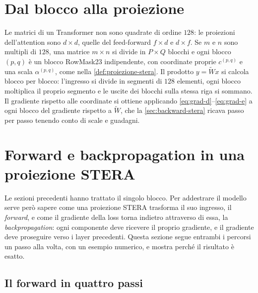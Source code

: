 \section{Dal blocco alla proiezione}
\label{sec:rettangolari}

Le matrici di un Transformer non sono quadrate di ordine $128$: le proiezioni dell'attention sono $d\times d$, quelle del feed-forward $f\times d$ e $d\times f$. Se $m$ e $n$ sono multipli di $128$, una matrice $m\times n$ si divide in $P\times Q$ blocchi e ogni blocco $(p,q)$ è un blocco RowMask23 indipendente, con coordinate proprie $c^{(p,q)}$ e una scala $\alpha^{(p,q)}$, come nella \autoref{def:proiezione-stera}. Il prodotto $y=\widetilde Wx$ si calcola blocco per blocco: l'ingresso si divide in segmenti di $128$ elementi, ogni blocco moltiplica il proprio segmento e le uscite dei blocchi sulla stessa riga si sommano. Il gradiente rispetto alle coordinate si ottiene applicando \eqref{eq:grad-d}--\eqref{eq:grad-e} a ogni blocco del gradiente rispetto a $\widetilde W$, che la \autoref{sec:backward-stera} ricava passo per passo tenendo conto di scale e guadagni.




\section{Forward e backpropagation in una proiezione STERA}
\label{sec:backward-stera}

Le sezioni precedenti hanno trattato il singolo blocco. Per addestrare il modello serve però sapere come una proiezione STERA trasforma il suo ingresso, il \emph{forward}, e come il gradiente della loss torna indietro attraverso di essa, la \emph{backpropagation}: ogni componente deve ricevere il proprio gradiente, e il gradiente deve proseguire verso i layer precedenti. Questa sezione segue entrambi i percorsi un passo alla volta, con un esempio numerico, e mostra perché il risultato è esatto.

\subsection{Il forward in quattro passi}
\label{sec:forward-stera}

